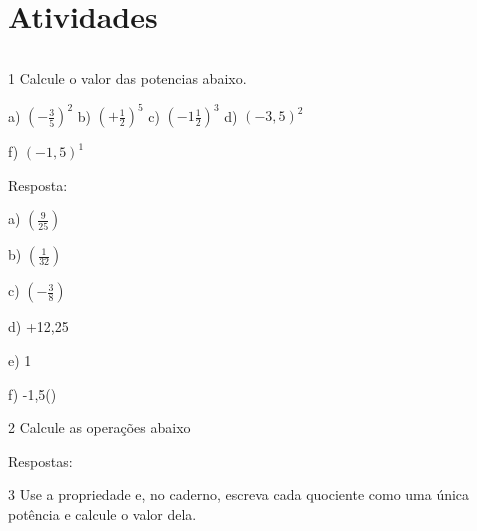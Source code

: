 \section{Atividades}

\[\ \]

\num{1} Calcule o valor das potencias abaixo.


a) $(-\frac{3}{5})^{2}$
b) $( + \frac{1}{2})^{5}$
c) $( - 1\frac{1}{2})^{3}$
d) $(-3,5)^2$

f) $(-1,5)^1$


Resposta:

a) $(\frac{9}{25})$

b) $(\frac{1}{32})$

c) $(-\frac{3}{8})$

d) +12,25

e) 1

f) -1,5()

\num{2} Calcule as operações abaixo



Respostas:






\num{3} Use a propriedade e, no caderno, escreva cada quociente como uma
única potência e calcule o valor dela.

